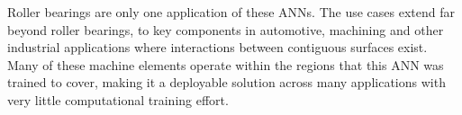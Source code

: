 Roller bearings are only one application of these ANNs. The use cases extend far beyond roller bearings, to key components in automotive, machining and other industrial applications where interactions between contiguous surfaces exist. Many of these machine elements operate within the regions that this ANN was trained to cover, making it a deployable solution across many applications with very little computational training effort.



